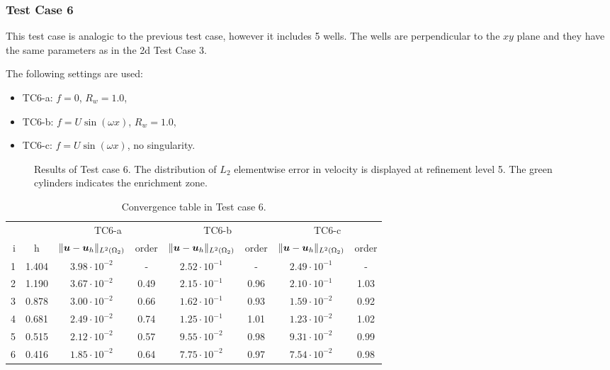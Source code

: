 \subsubsection{Test Case 6}
This test case is analogic to the previous test case, however it includes 5 wells.
The wells are perpendicular to the $xy$ plane and they have the same parameters as in the 2d Test Case 3.

The following settings are used:
\begin{itemize}
    \item TC6-a: $f=0$, $R_w=1.0$,
    \item TC6-b: $f=U\sin(\omega x)$, $R_w=1.0$,
    \item TC6-c: $f=U\sin(\omega x)$, no singularity.
\end{itemize}
%
\begin{figure}[!htb]
    \centering
    \caption[Error distribution in Test case 6.]
    {Results of Test case 6. The distribution of $L_2$ elementwise error in velocity is displayed at refinement level 5.
    The green cylinders indicates the enrichment zone. }
    \label{fig:mh_tc6_error}
\end{figure}
%

\begin{table}[!htb]
\begin{center}
\bgroup
\def\arraystretch{1.2}
\setlength\tabcolsep{5pt}
\begin{tabular}{rc|cc|cc|cc}
\toprule
\multicolumn{2}{c|}{} & \multicolumn{2}{c|}{ TC6-a } & \multicolumn{2}{c|}{ TC6-b } & \multicolumn{2}{c}{TC6-c}\\ [3pt] %
i & h & $\|\mathbf{\boldsymbol{u}}-\mathbf{\boldsymbol{u}}_h\|_{L^2(\Omega_2)}$ & order & $\|\mathbf{\boldsymbol{u}}-\mathbf{\boldsymbol{u}}_h\|_{L^2(\Omega_2)}$
    & order & $\|\mathbf{\boldsymbol{u}}-\mathbf{\boldsymbol{u}}_h\|_{L^2(\Omega_2)}$ & order \\ [3pt] \midrule
1 & 1.404 &  $3.98\cdot10^{-2}$  &  -   &  $2.52\cdot10^{-1}$  &  -   &  $2.49\cdot10^{-1}$ &   -   \\
2 & 1.190 &  $3.67\cdot10^{-2}$  & 0.49 &  $2.15\cdot10^{-1}$  & 0.96 &  $2.10\cdot10^{-1}$ &  1.03 \\
3 & 0.878 &  $3.00\cdot10^{-2}$  & 0.66 &  $1.62\cdot10^{-1}$  & 0.93 &  $1.59\cdot10^{-2}$ &  0.92 \\
4 & 0.681 &  $2.49\cdot10^{-2}$  & 0.74 &  $1.25\cdot10^{-1}$  & 1.01 &  $1.23\cdot10^{-2}$ &  1.02 \\
5 & 0.515 &  $2.12\cdot10^{-2}$  & 0.57 &  $9.55\cdot10^{-2}$  & 0.98 &  $9.31\cdot10^{-2}$ &  0.99 \\
6 & 0.416 &  $1.85\cdot10^{-2}$  & 0.64 &  $7.75\cdot10^{-2}$  & 0.97 &  $7.54\cdot10^{-2}$ &  0.98 \\
\bottomrule
\end{tabular}
\caption{Convergence table in Test case 6.}
\label{tab:mh_tc6_convergence}
\egroup
\end{center}
\end{table}

